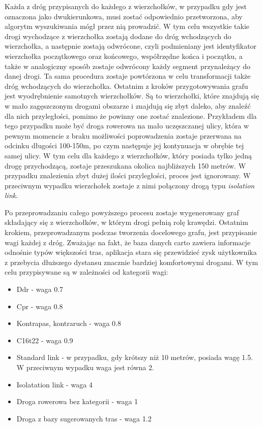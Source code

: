 Każda z dróg przypisanych do każdego z wierzchołków, w przypadku gdy jest oznaczona jako dwukierunkowa, musi zostać odpowiednio przetworzona, aby algorytm wyszukiwania mógł przez nią prowadzić. W tym celu wszystkie takie drogi wychodzące z wierzchołka zostają dodane do dróg wchodzących do wierzchołka, a następnie zostają odwrócone, czyli podmieniany jest identyfikator wierzchołka początkowego oraz końcowego, współrzędne końca i początku, a także w analogiczny sposób zostaje odwrócony każdy segment przynależący do danej drogi. Ta sama procedura zostaje powtórzona w celu transformacji także dróg wchodzących do wierzchołka.
Ostatnim z kroków przygotowywania grafu jest wyodrębnienie samotnych wierzchołków. Są to wierzchołki, które znajdują się w mało zagęszczonym drogami obszarze i znajdują się zbyt daleko, aby znaleźć dla nich przyległości, pomimo że powinny one zostać znalezione. Przykładem dla tego przypadku może być droga rowerowa na mało uczęszczanej ulicy, która w pewnym momencie z braku możliwości poprowadzenia zostaje przerwana na odcinku długości 100-150m, po czym następuje jej kontynuacja w obrębie tej samej ulicy. W tym celu dla każdego z wierzchołków, który posiada tylko jedną drogę przychodzącą, zostaje przeszukana okolica najbliższych 150 metrów. W przypadku znalezienia zbyt dużej ilości przyległości, proces jest ignorowany. W przeciwnym wypadku wierzchołek zostaje z nimi połączony drogą typu \textit{isolation link}. \newline

Po przeprowadzaniu całego powyższego procesu zostaje wygenerowany graf składający się z wierzchołków, w którym drogi pełnią rolę krawędzi. Ostatnim krokiem, przeprowadzanym podczas tworzenia docelowego grafu, jest przypisanie wagi każdej z dróg. Zważając na fakt, że baza danych carto zawiera informacje odnośnie typów większości tras, aplikacja stara się przewidzieć zysk użytkownika z przebycia dłuższego dystansu znacznie bardziej komfortowymi drogami. W tym celu przypisywane są w zależności od kategorii wagi:

\begin{itemize}
\item Ddr - waga 0.7
\item Cpr - waga 0.8
\item Kontrapas, kontraruch - waga 0.8
\item C16t22 - waga 0.9
\item Standard link - w przypadku, gdy krótszy niż 10 metrów, posiada wagę 1.5. W przeciwnym wypadku waga jest równa 2.
\item Isolatation link - waga 4
\item Droga rowerowa bez kategorii - waga 1
\item Droga z bazy sugerowanych tras - waga 1.2
\end{itemize}

